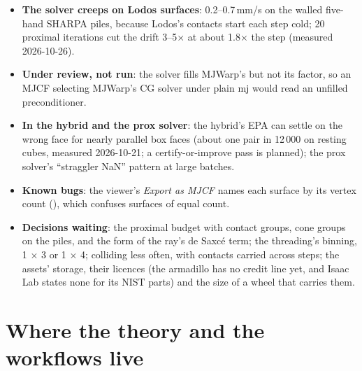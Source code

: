 \begin{itemize}
\item \textbf{The solver creeps on Lodos surfaces}: 0.2--0.7\,mm/s on the walled five-hand SHARPA piles, because Lodos's contacts start each step cold; 20 proximal iterations cut the drift 3--5$\times$ at about 1.8$\times$ the step (measured 2026-10-26).
\item \textbf{Under review, not run}: the solver fills MJWarp's  but not its factor, so an MJCF selecting MJWarp's CG solver under plain mj would read an unfilled preconditioner.
\item \textbf{In the hybrid and the prox solver}: the hybrid's EPA can settle on the wrong face for nearly parallel box faces (about one pair in 12\,000 on resting cubes, measured 2026-10-21; a certify-or-improve pass is planned); the prox solver's ``straggler NaN'' pattern at large batches.
\item \textbf{Known bugs}: the viewer's \emph{Export as MJCF} names each surface by its vertex count (), which confuses surfaces of equal count.
\item \textbf{Decisions waiting}: the proximal budget with contact groups, cone groups on the piles, and the form of the ray's de Saxc\'e term; the threading's binning, 1 $\times$ 3 or 1 $\times$ 4; colliding less often, with contacts carried across steps; the assets' storage, their licences (the armadillo has no credit line yet, and Isaac Lab states none for its NIST parts) and the size of a wheel that carries them.
\end{itemize}

\section{Where the theory and the workflows live}\label{sec:docs}

